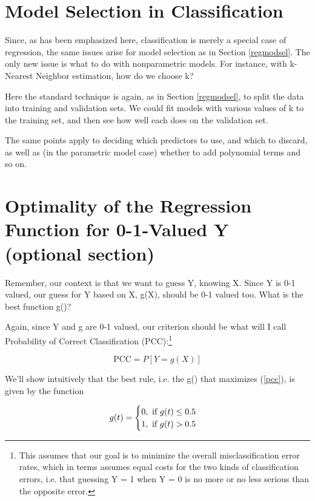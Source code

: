 \section{Model Selection in Classification}

Since, as has been emphasized here, classification is merely a special
case of regression, the same issues arise for model selection as in
Section \ref{regmodsel}.  The only new issue is what to do with
nonparametric models.  For instance, with k-Nearest Neighbor estimation,
how do we choose k?

Here the standard technique is again, as in Section \ref{regmodsel}, to split
the data into training and validation sets.  We could fit models with
various values of k to the training set, and then see how well each does
on the validation set.

The same points apply to deciding which predictors to use, and which to
discard, as well as (in the parametric model case) whether to add
polynomial terms and so on.

\section{Optimality of the Regression Function for 0-1-Valued Y
(optional section)}
\label{optimal2}

Remember, our context is that we want to guess Y, knowing X.  Since Y is
0-1 valued, our guess for Y based on X, g(X), should be 0-1 valued too.
What is the best function g()?

Again, since Y and g are 0-1 valued, our criterion should be what will I
call Probability of Correct Classification (PCC):\footnote{This assumes
that our goal is to minimize the overall misclassification error rates,
which in terms assumes equal costs for the two kinds of classification
errors, i.e. that guessing Y = 1 when Y = 0 is no more or no less
serious than the opposite error.}

\begin{equation}
\label{pcc}
\textrm{PCC} = P[Y = g(X)]
\end{equation}

We'll show intuitively that the best rule, i.e. the g() that maximizes
(\ref{pcc}), is given by the function

\begin{equation}
\label{bestg}
g(t) = 
\begin{cases}
0, \textrm{ if } g(t) \leq 0.5 \cr
1, \textrm{ if } g(t) > 0.5 \cr
\end{cases}
\end{equation}

